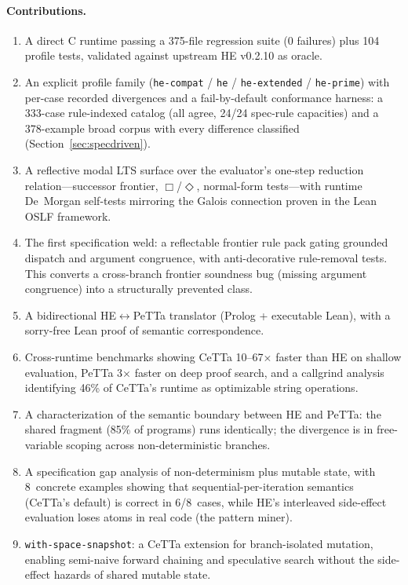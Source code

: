 \documentclass[11pt]{article}
\newcommand{\code}[1]{\texttt{#1}}
\newcommand{\PeTTa}{\textup{PeTTa}}
\newcommand{\HE}{\textup{HE}}
\newcommand{\CeTTa}{\textup{CeTTa}}
\begin{document}
\paragraph{Contributions.}
\begin{enumerate}
\item A direct C runtime passing a 375-file regression suite (0
  failures) plus 104 profile tests, validated against upstream \HE{}
  v0.2.10 as oracle.
\item An explicit profile family (\code{he-compat} / \code{he} /
  \code{he-extended} / \code{he-prime}) with per-case recorded
  divergences and a fail-by-default conformance harness: a 333-case
  rule-indexed catalog (all agree, 24/24 spec-rule capacities) and a
  378-example broad corpus with every difference classified
  (Section~\ref{sec:specdriven}).
\item A reflective modal LTS surface over the evaluator's one-step
  reduction relation---successor frontier, $\Box$/$\Diamond$,
  normal-form tests---with runtime De~Morgan self-tests mirroring the
  Galois connection proven in the Lean OSLF framework.
\item The first specification weld: a reflectable frontier rule pack
  gating grounded dispatch and argument congruence, with
  anti-decorative rule-removal tests.  This converts a cross-branch
  frontier soundness bug (missing argument congruence) into a
  structurally prevented class.
\item A bidirectional \HE{}$\leftrightarrow$\PeTTa{} translator
  (Prolog + executable Lean), with a sorry-free Lean proof of semantic
  correspondence.
\item Cross-runtime benchmarks showing \CeTTa{} 10--67$\times$ faster
  than \HE{} on shallow evaluation, \PeTTa{} 3$\times$ faster on deep
  proof search, and a callgrind analysis identifying 46\% of \CeTTa{}'s
  runtime as optimizable string operations.
\item A characterization of the semantic boundary between \HE{} and
  \PeTTa{}: the shared fragment (85\% of programs) runs identically; the
  divergence is in free-variable scoping across non-deterministic branches.
\item A specification gap analysis of non-determinism plus mutable state,
  with 8~concrete examples showing that sequential-per-iteration semantics
  (CeTTa's default) is correct in 6/8~cases, while \HE{}'s interleaved
  side-effect evaluation loses atoms in real code (the pattern miner).
\item \code{with-space-snapshot}: a CeTTa extension for branch-isolated
  mutation, enabling semi-naive forward chaining and speculative search
  without the side-effect hazards of shared mutable state.
\end{enumerate}
\end{document}
